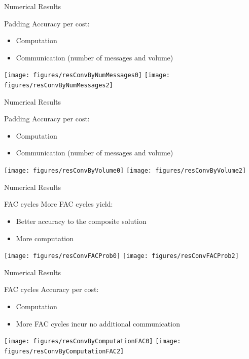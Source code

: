 \documentclass[18pt,xcolor=table]{beamer}
\begin{document}
\begin{frame}{Numerical Results}
\begin{block}{Padding}
Accuracy per cost:
\begin{itemize}
   \item Computation
   \item Communication (number of messages and volume)
\end{itemize}
\end{block}

\centering
\vspace{0.5 cm}
\texttt{[image: figures/resConvByNumMessages0]}
\texttt{[image: figures/resConvByNumMessages2]}

\end{frame}

\begin{frame}{Numerical Results}
\begin{block}{Padding}
Accuracy per cost:
\begin{itemize}
   \item Computation
   \item Communication (number of messages and volume)
\end{itemize}
\end{block}

\centering
\vspace{0.5 cm}
\texttt{[image: figures/resConvByVolume0]}
\texttt{[image: figures/resConvByVolume2]}

\end{frame}

\begin{frame}{Numerical Results}
\begin{block}{FAC cycles}
More FAC cycles yield:
\begin{itemize}
   \item Better accuracy to the composite solution
   \item More computation
\end{itemize}
\end{block}

\centering
\vspace{0.5 cm}
\texttt{[image: figures/resConvFACProb0]}
\texttt{[image: figures/resConvFACProb2]}

\end{frame}

\begin{frame}{Numerical Results}
\begin{block}{FAC cycles}
Accuracy per cost:
\begin{itemize}
   \item Computation
   \item More FAC cycles incur no additional communication
\end{itemize}
\end{block}

\centering
\vspace{0.5 cm}
\texttt{[image: figures/resConvByComputationFAC0]}
\texttt{[image: figures/resConvByComputationFAC2]}

\end{frame}
\end{document}
